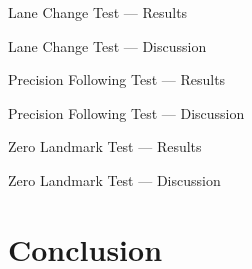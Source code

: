 \documentclass{beamer}
\begin{document}
    \begin{frame}{Lane Change Test --- Results}
    \end{frame}

    \begin{frame}{Lane Change Test --- Discussion}
    \end{frame}

    \begin{frame}{Precision Following Test --- Results}
    \end{frame}

    \begin{frame}{Precision Following Test --- Discussion}
    \end{frame}

    \begin{frame}{Zero Landmark Test ---  Results}
    \end{frame}

    \begin{frame}{Zero Landmark Test ---  Discussion}
    \end{frame}


\section{Conclusion}

  \begin{frame}
  \end{frame}
\end{document}
